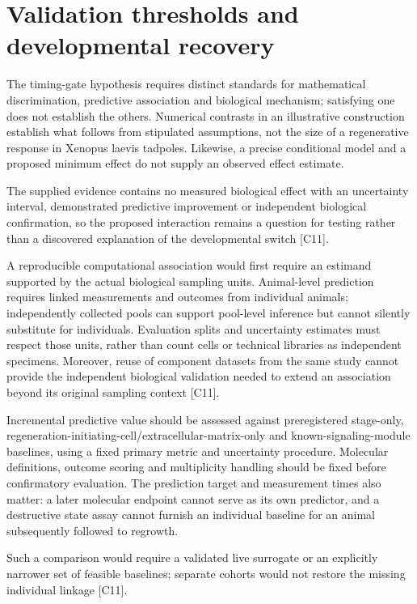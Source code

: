 \documentclass[11pt]{article}
\begin{document}
\section{Validation thresholds and developmental recovery}
The timing-gate hypothesis requires distinct standards for mathematical discrimination, predictive association and biological mechanism; satisfying one does not establish the others. Numerical contrasts in an illustrative construction establish what follows from stipulated assumptions, not the size of a regenerative response in Xenopus laevis tadpoles. Likewise, a precise conditional model and a proposed minimum effect do not supply an observed effect estimate.

The supplied evidence contains no measured biological effect with an uncertainty interval, demonstrated predictive improvement or independent biological confirmation, so the proposed interaction remains a question for testing rather than a discovered explanation of the developmental switch [C11].

A reproducible computational association would first require an estimand supported by the actual biological sampling units. Animal-level prediction requires linked measurements and outcomes from individual animals; independently collected pools can support pool-level inference but cannot silently substitute for individuals. Evaluation splits and uncertainty estimates must respect those units, rather than count cells or technical libraries as independent specimens. Moreover, reuse of component datasets from the same study cannot provide the independent biological validation needed to extend an association beyond its original sampling context [C11].

Incremental predictive value should be assessed against preregistered stage-only, regeneration-initiating-cell/extracellular-matrix-only and known-signaling-module baselines, using a fixed primary metric and uncertainty procedure. Molecular definitions, outcome scoring and multiplicity handling should be fixed before confirmatory evaluation. The prediction target and measurement times also matter: a later molecular endpoint cannot serve as its own predictor, and a destructive state assay cannot furnish an individual baseline for an animal subsequently followed to regrowth.

Such a comparison would require a validated live surrogate or an explicitly narrower set of feasible baselines; separate cohorts would not restore the missing individual linkage [C11].
\end{document}
